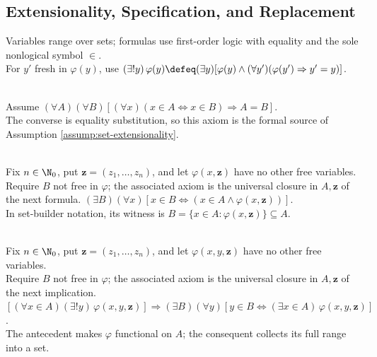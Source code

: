 \subsection{Extensionality, Specification, and Replacement}

Variables range over sets; formulas use first-order logic with equality and the sole nonlogical symbol $\in$.\\
For $y'$ fresh in $\varphi(y)$, use $(\exists!y)\,\varphi(y)\defeq(\exists y)[\varphi(y)\land(\forall y')(\varphi(y')\Rightarrow y'=y)]$.

\begin{assumption} \label{assump:formal-axiom-of-extensionality} \\
Assume $(\forall A)(\forall B)[(\forall x)(x\in A\Longleftrightarrow x\in B)\Rightarrow A=B]$.\\
The converse is equality substitution, so this axiom is the formal source of Assumption \ref{assump:set-extensionality}.
\end{assumption}

\begin{assumption} \label{assump:formal-separation-schema} \\
Fix $n\in\N_0$, put $\mathbf{z}=(z_1,\ldots,z_n)$, and let $\varphi(x,\mathbf{z})$ have no other free variables.\\
Require $B$ not free in $\varphi$; the associated axiom is the universal closure in $A,\mathbf{z}$ of the next formula. $(\exists B)(\forall x)[x\in B\Longleftrightarrow(x\in A\land\varphi(x,\mathbf{z}))]$.\\
In set-builder notation, its witness is $B=\{x\in A:\varphi(x,\mathbf{z})\}\subseteq A$.
\end{assumption}

\begin{assumption} \label{assump:formal-replacement-schema} \\
Fix $n\in\N_0$, put $\mathbf{z}=(z_1,\ldots,z_n)$, and let $\varphi(x,y,\mathbf{z})$ have no other free variables.\\
Require $B$ not free in $\varphi$; the associated axiom is the universal closure in $A,\mathbf{z}$ of the next implication.\\
$[(\forall x\in A)(\exists!y)\,\varphi(x,y,\mathbf{z})]\Rightarrow(\exists B)(\forall y)[y\in B\Longleftrightarrow(\exists x\in A)\,\varphi(x,y,\mathbf{z})]$.\\
The antecedent makes $\varphi$ functional on $A$; the consequent collects its full range into a set.
\end{assumption}

